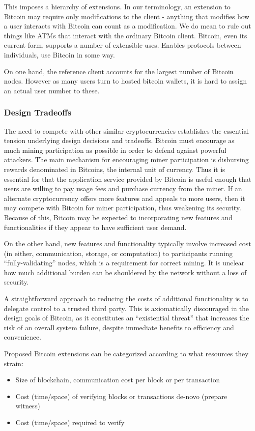 This imposes a hierarchy of extensions. In our terminology, an extension to Bitcoin may require only modifications to the client - anything that modifies how a user interacts with Bitcoin can count as a modification. We do mean to rule out things like ATMs that interact with the ordinary Bitcoin client. Bitcoin, even its current form, supports a number of extensible uses. Enables protocols between individuals, use Bitcoin in some way.

On one hand, the reference client accounts for the largest number of Bitcoin nodes. However as many users turn to hosted bitcoin wallets, it is hard to assign an actual user number to these.

\subsubsection{Design Tradeoffs}
The need to compete with other similar cryptocurrencies establishes the essential tension underlying design decisions and tradeoffs. Bitcoin must encourage as much mining participation as possible in order to defend against powerful attackers. The main mechanism for encouraging miner participation is disbursing rewards denominated in Bitcoins, the internal unit of currency. Thus it is essential for that the application service provided by Bitcoin is useful enough that users are willing to pay usage fees and purchase currency from the miner. If an alternate cryptocurrency offers more features and appeals to more users, then it may compete with Bitcoin for miner participation, thus weakening its security. Because of this, Bitcoin may be expected to incorporating new features and functionalities if they appear to have sufficient user demand.

On the other hand, new features and functionality typically involve increased cost (in either, communication, storage, or computation) to participants running ``fully-validating'' nodes, which is a requirement for correct mining. It is unclear how much additional burden can be shouldered by the network without a loss of security.

A straightforward approach to reducing the costs of additional functionality is to delegate control to a trusted third party. This is axiomatically discouraged in the design goals of Bitcoin, as it constitutes an ``existential threat'' that increases the risk of an overall system failure, despite immediate benefits to efficiency and convenience.
 
Proposed Bitcoin extensions can be categorized according to what resources they strain:
\begin{itemize}
\item Size of blockchain, communication cost per block or per transaction
\item Cost (time/space) of verifying blocks or transactions de-novo (prepare witness)
\item Cost (time/space) required to verify
\end{itemize}

